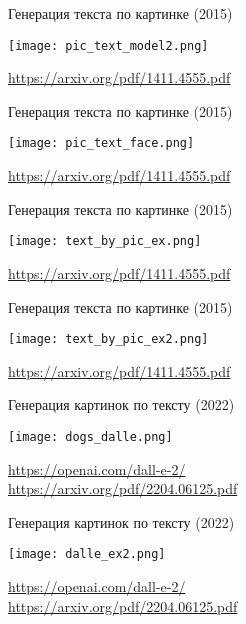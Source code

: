\documentclass[notes,12pt, aspectratio=169]{beamer}
\begin{document}
\begin{frame}{Генерация текста по картинке (2015)}
	\begin{center}
		\texttt{[image: pic\_text\_model2.png]}
	\end{center}
	\vfill
	\footnotesize  {\color{blue} \url{https://arxiv.org/pdf/1411.4555.pdf}}
\end{frame} 


\begin{frame}{Генерация текста по картинке (2015)}
	\begin{center}
		\texttt{[image: pic\_text\_face.png]}
	\end{center}
	\vfill
	\footnotesize  {\color{blue} \url{https://arxiv.org/pdf/1411.4555.pdf}}
\end{frame} 



\begin{frame}{Генерация текста по картинке (2015)}
	\begin{center}
		\texttt{[image: text\_by\_pic\_ex.png]}
	\end{center}
	\vfill
	\footnotesize  {\color{blue} \url{https://arxiv.org/pdf/1411.4555.pdf}}
\end{frame} 


\begin{frame}{Генерация текста по картинке (2015)}
	\begin{center}
		\texttt{[image: text\_by\_pic\_ex2.png]}
	\end{center}
	\vfill
	\footnotesize  {\color{blue} \url{https://arxiv.org/pdf/1411.4555.pdf}}
\end{frame} 


\begin{frame}{Генерация картинок по тексту (2022)}
	\begin{center}
		\texttt{[image: dogs\_dalle.png]}
	\end{center}
	\vfill
	\footnotesize  {\color{blue} \url{https://openai.com/dall-e-2/} \\ \url{https://arxiv.org/pdf/2204.06125.pdf}} 
\end{frame} 



\begin{frame}{Генерация картинок по тексту (2022)}
	\begin{center}
		\texttt{[image: dalle\_ex2.png]}
	\end{center}
	\vfill
\footnotesize  {\color{blue} \url{https://openai.com/dall-e-2/} \\ \url{https://arxiv.org/pdf/2204.06125.pdf}} 
\end{frame} 
\end{document}
